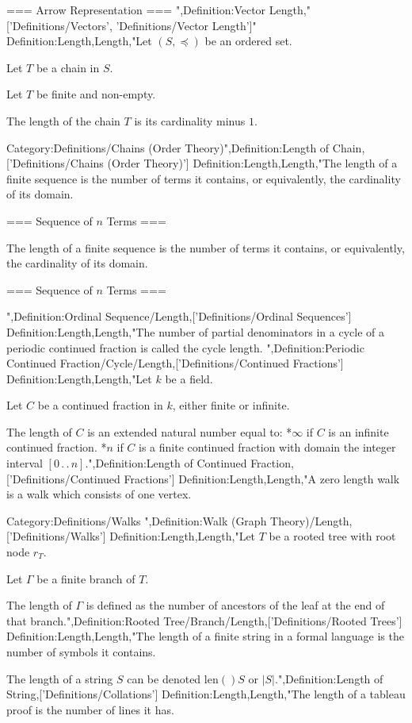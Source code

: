 === Arrow Representation ===
",Definition:Vector Length,"['Definitions/Vectors', 'Definitions/Vector Length']"
Definition:Length,Length,"Let $\left( S, \preceq \right)$ be an ordered set.

Let $T$ be a chain in $S$.

Let $T$ be finite and non-empty.


The length of the chain $T$ is its cardinality minus $1$.


Category:Definitions/Chains (Order Theory)",Definition:Length of Chain,['Definitions/Chains (Order Theory)']
Definition:Length,Length,"The length of a finite sequence is the number of terms it contains, or equivalently, the cardinality of its domain.


=== Sequence of $n$ Terms ===

The length of a finite sequence is the number of terms it contains, or equivalently, the cardinality of its domain.


=== Sequence of $n$ Terms ===

",Definition:Ordinal Sequence/Length,['Definitions/Ordinal Sequences']
Definition:Length,Length,"The number of partial denominators in a cycle of a periodic continued fraction is called the cycle length.
",Definition:Periodic Continued Fraction/Cycle/Length,['Definitions/Continued Fractions']
Definition:Length,Length,"Let $k$ be a field.

Let $C$ be a continued fraction in $k$, either finite or infinite.


The length of $C$ is an extended natural number equal to:
*$\infty$ if $C$ is an infinite continued fraction.
*$n$ if $C$ is a finite continued fraction with domain the integer interval $\left[0 \,.\,.\, n\right]$.",Definition:Length of Continued Fraction,['Definitions/Continued Fractions']
Definition:Length,Length,"A zero length walk is a walk which consists of one vertex.


Category:Definitions/Walks
",Definition:Walk (Graph Theory)/Length,['Definitions/Walks']
Definition:Length,Length,"Let $T$ be a rooted tree with root node $r_T$.

Let $\Gamma$ be a finite branch of $T$.


The length of $\Gamma$ is defined as the number of ancestors of the leaf at the end of that branch.",Definition:Rooted Tree/Branch/Length,['Definitions/Rooted Trees']
Definition:Length,Length,"The length of a finite string in a formal language is the number of symbols it contains.


The length of a string $S$ can be denoted $\mathrm {len} \left(   \right)S$ or $\left\lvert S \right\rvert$.",Definition:Length of String,['Definitions/Collations']
Definition:Length,Length,"The length of a tableau proof is the number of lines it has.


